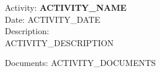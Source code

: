 Activity: \textbf{{{ ACTIVITY_NAME }}} \\
Date: {{ ACTIVITY_DATE }} \\
Description: \\
{{ ACTIVITY_DESCRIPTION }}

Documents:
{{ ACTIVITY_DOCUMENTS }}
